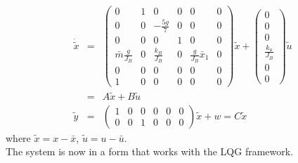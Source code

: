\begin{eqnarray*}
\dot{\tilde{x}} & = & \begin{pmatrix}0 & 1 & 0 & 0 & 0 & 0\\
0 & 0 & -\frac{5g}{7} & 0 & 0 & 0\\
0 & 0 & 0 & 1 & 0 & 0\\
\bar{m}\frac{g}{J_B} & 0 & \frac{k_B}{J_B} & 0 & \frac{g}{J_B}\bar{x}_{1} & 0\\
0 & 0 & 0 & 0 & 0 & 0\\
1 & 0 & 0 & 0 & 0 & 0
\end{pmatrix}\tilde{x}+\begin{pmatrix}0\\
0\\
0\\
\frac{k_{u}}{J_B}\\
0\\
0
\end{pmatrix}\tilde{u}\\
 & = & A\tilde{x}+B\tilde{u}\\
\tilde{y} & = & \begin{pmatrix}1 & 0 & 0 & 0 & 0 & 0\\
0 & 0 & 1 & 0 & 0 & 0
\end{pmatrix}\tilde{x}+w=C\tilde{x}
\end{eqnarray*}
where $\tilde{x}=x-\bar{x}$, $\tilde{u}=u-\bar{u}$.
\\
The system is now in a form that works with the LQG framework.






